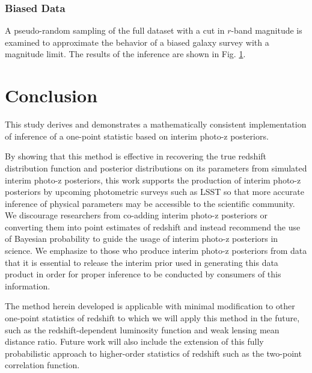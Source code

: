 \documentclass[preprint]{aastex}
\begin{document}
\subsubsection{Biased Data}
\label{sec:biased}

A pseudo-random sampling of the full dataset with a cut in $r$-band magnitude 
is examined to approximate the behavior of a biased galaxy survey with a 
magnitude limit.  The results of the inference are shown in Fig. 
\ref{fig:biasparam}.

\begin{figure}
\caption{}
\label{fig:biasparam}
\end{figure}

\clearpage
\section{Conclusion}
\label{sec:con}

This study derives and demonstrates a mathematically consistent implementation 
of inference of a one-point statistic based on interim photo-z posteriors.  

By showing that this method is effective in recovering the true redshift 
distribution function and posterior distributions on its parameters from 
simulated interim photo-z posteriors, this work supports the production of 
interim photo-z posteriors by upcoming photometric surveys such as LSST so that 
more accurate inference of physical parameters may be accessible to the 
scientific community.  We discourage researchers from co-adding interim photo-z 
posteriors or converting them into point estimates of redshift and instead 
recommend the use of Bayesian probability to guide the usage of interim photo-z 
posteriors in science.  We emphasize to those who produce interim photo-z 
posteriors from data that it is essential to release the interim prior used in 
generating this data product in order for proper inference to be conducted by 
consumers of this information.

The method herein developed is applicable with minimal modification to other 
one-point statistics of redshift to which we will apply this method in the 
future, such as the redshift-dependent luminosity function and weak lensing 
mean distance ratio.  Future work will also include the extension of this fully 
probabilistic approach to higher-order statistics of redshift such as the 
two-point correlation function.
\end{document}
